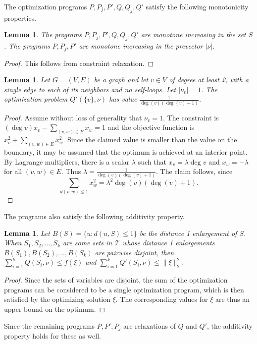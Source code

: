 \documentclass[a4paper, 12pt, notitlepage]{amsart}
\newcommand{\sT}{\mathscr{T}}
\newtheorem{lemma}[theorem]{Lemma}
\theoremstyle{remark}
\begin{document}
The optimization programs $P, P_j, P', Q, Q_j, Q'$ satisfy the following monotonicity properties.
\begin{lemma}
 The programs $P, P_j, P', Q, Q_j, Q'$ are monotone increasing in the set $S$.  The programs $P, P_j, P'$ are monotone increasing in the prevector $|\nu|$.
\end{lemma}

\begin{proof}
 This follows from constraint relaxation.
\end{proof}

\begin{lemma}\label{2_norm_opt_lemma}
 Let $G = (V,E)$ be a graph and let $v \in V$ of degree at least 2, with a single edge to each of its neighbors and no self-loops. Let $|\nu_v| = 1$.   The optimization problem $Q'(\{v\}, \nu)$ 
has value $\frac{1}{\deg(v)(\deg(v) + 1)}$.
\end{lemma}
\begin{proof}
Assume without loss of generality that $\nu_v = 1$. The constraint is $(\deg v) x_v - \sum_{(v,w) \in E} x_w = 1$ and the objective function is $x_v^2 + \sum_{(v,w) \in E} x_w^2$. Since the claimed value is smaller than the value on the boundary, it may be assumed that the optimum is achieved at an interior point.
By Lagrange multipliers, there is a scalar $\lambda$ such that  $x_v = \lambda \deg v$ and $x_w = -\lambda$ for all $(v,w) \in E$.  Thus $\lambda = \frac{1}{\deg(v)(\deg(v) +1)}$.  The claim follows, since \begin{equation}\sum_{d(v,w) \leq 1} x_w^2 = \lambda^2 \deg(v)(\deg(v)+1).\end{equation}
\end{proof}


The programs also satisfy the following additivity property.
\begin{lemma}
 Let $B(S) = \{u: d(u, S) \leq 1\}$ be the distance 1 enlargement of $S$.  When $S_1, S_2, ..., S_k$ are some sets in $\sT$ whose distance 1 enlargements $B(S_1), B(S_2), ..., B(S_k)$ are pairwise disjoint, then $\sum_{i=1}^k Q(S_i, \nu) \leq f(\xi)$ and $\sum_{i=1}^k Q'(S_i, \nu) \leq \|\xi\|_2^2$.
\end{lemma}
\begin{proof}
 Since the sets of variables are disjoint, the sum of the optimization programs can be considered to be a single optimization program, which is then satisfied by the optimizing solution $\xi$.  The corresponding values for $\xi$ are thus an upper bound on the optimum.
\end{proof}
Since the remaining programs $P, P', P_j$ are relaxations of $Q$ and $Q'$, the additivity property holds for these as well.
\end{document}
